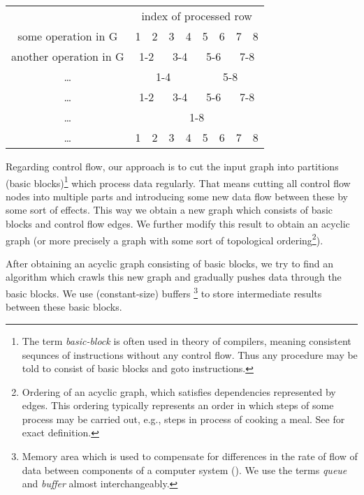 \begin{center}
  \begin{tabular}{c|c|c|c|c|c|c|c|c|}
    \cline{2-9}
    & \multicolumn{8}{c|}{index of processed row}\\
    \cline{2-9}
    some operation in G & 1 & 2 & 3 & 4 & 5 & 6 & 7 & 8 \\
    \cline{2-9}
    another operation in G & \multicolumn{2}{c|}{1-2} & \multicolumn{2}{c|}{3-4} & \multicolumn{2}{c|}{5-6} & \multicolumn{2}{c|}{7-8} \\
    \cline{2-9}
    \dots & \multicolumn{4}{c|}{1-4} & \multicolumn{4}{c|}{5-8}\\
    \cline{2-9}
    \dots & \multicolumn{2}{c|}{1-2} & \multicolumn{2}{c|}{3-4} & \multicolumn{2}{c|}{5-6} & \multicolumn{2}{c|}{7-8}\\
    \cline{2-9}
    \dots & \multicolumn{8}{c|}{1-8} \\
    \cline{2-9}
    \dots & 1 & 2 & 3 & 4 & 5 & 6 & 7 & 8\\
    \cline{2-9}
  \end{tabular}
\end{center}


  Regarding control flow, our approach is to cut the input graph into partitions (basic blocks)\footnote{The term \emph{basic-block} is often used in theory of compilers, meaning consistent sequnces of instructions without any control flow. Thus any procedure may be told to consist of basic blocks and goto instructions.} which process data regularly. That means cutting all control flow nodes into multiple parts and introducing some new data flow between these by some sort of effects. This way we obtain a new graph which consists of basic blocks and control flow edges. We further modify this result to obtain an acyclic graph (or more precisely a graph with some sort of topological ordering\footnote{Ordering of an acyclic graph, which satisfies dependencies represented by edges. This ordering typically represents an order in which steps of some process may be carried out, e.g., steps in process of cooking a meal. See \cite{kapitoly} for exact definition.}). 


  After obtaining an acyclic graph consisting of basic blocks, we try to find an algorithm which crawls this new graph and gradually pushes data through the basic blocks. We use (constant-size) buffers \footnote{Memory area which is used to compensate for differences in the rate of flow of data between components of a computer system (\cite{thesarus}). We use the terms \emph{queue} and \emph{buffer} almost interchangeably.} to store intermediate results between these basic blocks.


